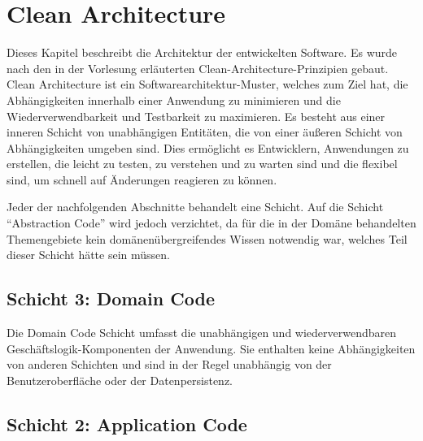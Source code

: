 \chapter{Clean Architecture}

Dieses Kapitel beschreibt die Architektur der entwickelten Software. Es wurde nach den in der Vorlesung erläuterten Clean-Architecture-Prinzipien gebaut. Clean Architecture ist ein Softwarearchitektur-Muster, welches zum Ziel hat, die Abhängigkeiten innerhalb einer Anwendung zu minimieren und die Wiederverwendbarkeit und Testbarkeit zu maximieren. Es besteht aus einer inneren Schicht von unabhängigen Entitäten, die von einer äußeren Schicht von Abhängigkeiten umgeben sind. Dies ermöglicht es Entwicklern, Anwendungen zu erstellen, die leicht zu testen, zu verstehen und zu warten sind und die flexibel sind, um schnell auf Änderungen reagieren zu können.


Jeder der nachfolgenden Abschnitte behandelt eine Schicht. Auf die Schicht \enquote{Abstraction Code} wird jedoch verzichtet, da für die in der Domäne behandelten Themengebiete kein domänenübergreifendes Wissen notwendig war, welches Teil dieser Schicht hätte sein müssen. 

\section{Schicht 3: Domain Code}

Die Domain Code Schicht umfasst die unabhängigen und wiederverwendbaren Geschäftslogik-Komponenten der Anwendung. Sie enthalten keine Abhängigkeiten von anderen Schichten und sind in der Regel unabhängig von der Benutzeroberfläche oder der Datenpersistenz.


\section{Schicht 2: Application Code}

